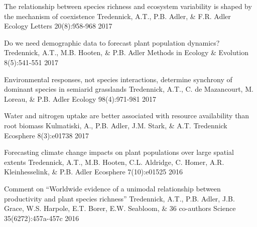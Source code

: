 

\begin{pubentries}

  \pubentry
    {The relationship between species richness and ecosystem variability is shaped by the mechanism of coexistence} %
    {Tredennick, A.T., P.B. Adler, \& F.R. Adler} %
    {Ecology Letters} %
    {20(8):958-968} %
    {2017} %

  \pubentry
    {Do we need demographic data to forecast plant population dynamics?} %
    {Tredennick, A.T., M.B. Hooten, \& P.B. Adler} %
    {Methods in Ecology \& Evolution} %
    {8(5):541-551} %
    {2017} %

  \pubentry
    {Environmental responses, not species interactions, determine synchrony of dominant species in semiarid grasslands} %
    {Tredennick, A.T., C. de Mazancourt, M. Loreau, \& P.B. Adler} %
    {Ecology} %
    {98(4):971-981} %
    {2017} %

  \pubentry
    {Water and nitrogen uptake are better associated with resource availability than root biomass} %
    {Kulmatiski, A., P.B. Adler, J.M. Stark, \& A.T. Tredennick} %
    {Ecosphere} %
    {8(3):e01738} %
    {2017} %

  \pubentry
    {Forecasting climate change impacts on plant populations over large spatial extents} %
    {Tredennick, A.T., M.B. Hooten, C.L. Aldridge, C. Homer, A.R. Kleinhesselink, \& P.B. Adler} %
    {Ecosphere} %
    {7(10):e01525} %
    {2016} %

  \pubentry
    {Comment on “Worldwide evidence of a unimodal relationship between productivity and plant species
richness”} %
    {Tredennick, A.T., P.B. Adler, J.B. Grace, W.S. Harpole, E.T. Borer, E.W. Seabloom, \& 36 co-authors} %
    {Science} %
    {35(6272):457a-457c} %
    {2016} %


\end{pubentries}
